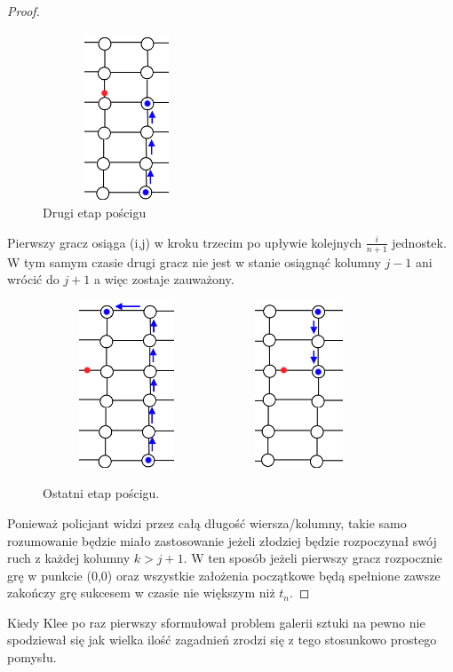 \documentclass[brudnopis]{xmgr}
\theoremstyle{definition}
\begin{document}
\begin{proof}
\begin{figure}[ht!]
	  \includegraphics[width=5cm,height=5cm]{rysunki/poscig_3.png}
	  \caption{Drugi etap pościgu}
	  \label{fig:drugi krok}
	\end{figure}

	\indent Pierwszy gracz osiąga (i,j) w kroku trzecim po upływie kolejnych $\frac{i}{n+1}$ jednostek. W tym samym czasie drugi gracz nie jest w stanie osiągnąć kolumny $j - 1$ ani wrócić do $j + 1$ a więc zostaje zauważony.
	\begin{figure}[ht!]
	  \centering
	  \includegraphics[width=5cm,height=5cm]{rysunki/poscig_4.png}
	  \includegraphics[width=5cm,height=5cm]{rysunki/poscig_5.png}
	  \caption{Ostatni etap pościgu.}
	  \label{fig:ostatni etap poscigu}
	\end{figure} 

	\indent Ponieważ policjant widzi przez całą długość wiersza/kolumny, takie samo rozumowanie będzie miało zastosowanie jeżeli złodziej będzie rozpoczynał swój ruch z każdej kolumny $k > j + 1$. W ten sposób jeżeli pierwszy gracz rozpocznie grę w punkcie (0,0) oraz wszystkie założenia początkowe będą spełnione zawsze zakończy grę sukcesem w czasie nie większym niż $t_n$.
\end{proof} 
\summary
Kiedy Klee po raz pierwszy sformułował problem galerii sztuki na pewno nie spodziewał się jak wielka ilość zagadnień zrodzi się z tego stosunkowo prostego pomysłu.
\end{document}
